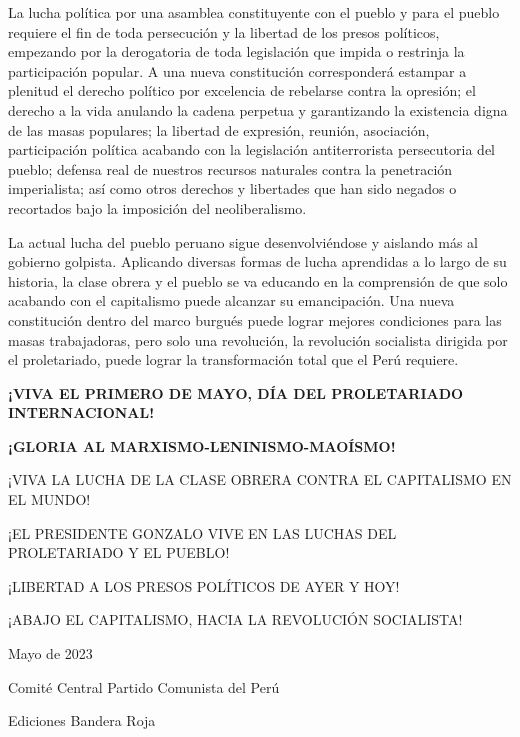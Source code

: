 \documentclass[
  a4paper,
]{article}
\begin{document}
La lucha política por una asamblea constituyente con el pueblo y para el
pueblo requiere el fin de toda persecución y la libertad de los presos
políticos, empezando por la derogatoria de toda legislación que impida o
restrinja la participación popular. A una nueva constitución
corresponderá estampar a plenitud el derecho político por excelencia de
rebelarse contra la opresión; el derecho a la vida anulando la cadena
perpetua y garantizando la existencia digna de las masas populares; la
libertad de expresión, reunión, asociación, participación política
acabando con la legislación antiterrorista persecutoria del pueblo;
defensa real de nuestros recursos naturales contra la penetración
imperialista; así como otros derechos y libertades que han sido negados
o recortados bajo la imposición del neoliberalismo.

La actual lucha del pueblo peruano sigue desenvolviéndose y aislando más
al gobierno golpista. Aplicando diversas formas de lucha aprendidas a lo
largo de su historia, la clase obrera y el pueblo se va educando en la
comprensión de que solo acabando con el capitalismo puede alcanzar su
emancipación. Una nueva constitución dentro del marco burgués puede
lograr mejores condiciones para las masas trabajadoras, pero solo una
revolución, la revolución socialista dirigida por el proletariado, puede
lograr la transformación total que el Perú requiere.

\textbf{¡VIVA EL PRIMERO DE MAYO, DÍA DEL PROLETARIADO INTERNACIONAL!}

\textbf{¡GLORIA AL MARXISMO-LENINISMO-MAOÍSMO!}

¡VIVA LA LUCHA DE LA CLASE OBRERA CONTRA EL CAPITALISMO EN EL MUNDO!

¡EL PRESIDENTE GONZALO VIVE EN LAS LUCHAS DEL PROLETARIADO Y EL PUEBLO!

¡LIBERTAD A LOS PRESOS POLÍTICOS DE AYER Y HOY!

¡ABAJO EL CAPITALISMO, HACIA LA REVOLUCIÓN SOCIALISTA!

Mayo de 2023

Comité Central Partido Comunista del Perú

Ediciones Bandera Roja


\printbibliography
\end{document}
